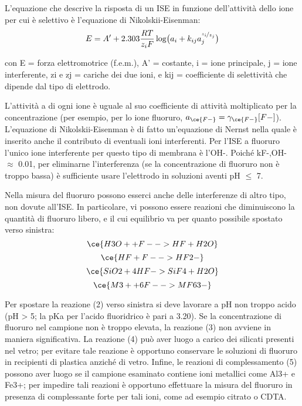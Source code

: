 L'equazione che descrive la risposta di un ISE in funzione dell'attività dello ione per cui è selettivo è l'equazione di Nikolskii-Eisenman:
\begin{equation} \label{eq:laboratorio:1}
E = A' + 2.303 \frac{RT}{z_i F}\log \bigl(a_i + k_{ij}a_j^{\nicefrac{z_i}{z_j}}\bigr)
\end{equation}

con E = forza elettromotrice (f.e.m.), A' = costante, i = ione principale, j = ione interferente, zi e zj = cariche dei due ioni, e kij = coefficiente di selettività che dipende dal tipo di elettrodo. 

L'attività a di ogni ione è uguale al suo coefficiente di attività moltiplicato per la concentrazione (per esempio, per lo ione fluoruro, $a_{\ce{F-}} = \gamma_{\ce{F-}}[F-]$). L'equazione di Nikolskii-Eisenman è di fatto un'equazione di Nernst nella quale è inserito anche il contributo di eventuali ioni interferenti.
Per l'ISE a fluoruro l'unico ione interferente per questo tipo di membrana è l'OH-. Poiché kF-,OH- $\approx$ 0.01, per eliminarne l'interferenza (se la concentrazione di fluoruro non è troppo bassa) è sufficiente usare l'elettrodo in soluzioni aventi pH $\leq$ 7.

Nella misura del fluoruro possono esserci anche delle interferenze di altro tipo, non dovute all'ISE. In particolare, vi possono essere reazioni che diminuiscono la quantità di fluoruro libero, e il cui equilibrio va per quanto possibile spostato verso sinistra:
\begin{equation} \label{eq:laboratorio:2}
\ce{H3O+ + F- -> HF + H2O}
\end{equation}
\begin{equation} \label{eq:laboratorio:3}
\ce{HF + F- -> HF2-}
\end{equation}
\begin{equation} \label{eq:laboratorio:4}
\ce{SiO2 + 4 HF -> SiF4 + H2O}
\end{equation}
\begin{equation} \label{eq:laboratorio:5}
\ce{M3+ + 6 F- -> MF63-}
\end{equation}

Per spostare la reazione (2) verso sinistra si deve lavorare a pH non troppo acido (pH > 5; la pKa per l'acido fluoridrico è pari a 3.20). Se la concentrazione di fluoruro nel campione non è troppo elevata, la reazione (3) non avviene in maniera significativa. La reazione (4) può aver luogo a carico dei silicati presenti nel vetro; per evitare tale reazione è opportuno conservare le soluzioni di fluoruro in recipienti di plastica anziché di vetro. Infine, le reazioni di complessamento (5) possono aver luogo se il campione esaminato contiene ioni metallici come Al3+ e Fe3+; per impedire tali reazioni è opportuno effettuare la misura del fluoruro in presenza di complessante forte per tali ioni, come ad esempio citrato o CDTA.

